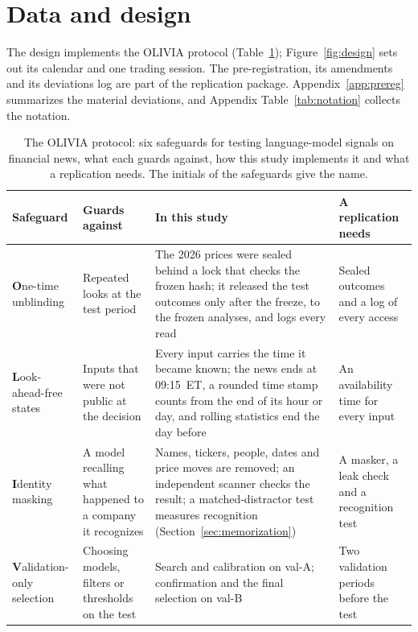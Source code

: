 \section{Data and design}\label{sec:design}

The design implements the OLIVIA protocol (Table~\ref{tab:olivia}); Figure~\ref{fig:design} sets out its calendar
and one trading session. The pre-registration, its amendments and its deviations log are part of the replication
package. Appendix~\ref{app:prereg} summarizes the material deviations, and Appendix Table~\ref{tab:notation}
collects the notation.

\begin{table}[tbp]
\centering
\footnotesize
\setlength{\tabcolsep}{4pt}
\caption{The OLIVIA protocol: six safeguards for testing language-model signals on financial news, what each
guards against, how this study implements it and what a replication needs. The initials of the safeguards give
the name.}\label{tab:olivia}
\begin{tabular}{@{}>{\raggedright\arraybackslash}p{1.0in}>{\raggedright\arraybackslash}p{1.4in}%
>{\raggedright\arraybackslash}p{2.6in}>{\raggedright\arraybackslash}p{1.1in}@{}}
\toprule
Safeguard & Guards against & In this study & A replication needs \\
\midrule
\textbf{O}ne-time unblinding & Repeated looks at the test period & The 2026 prices were sealed behind a lock that
checks the frozen hash; it released the test outcomes only after the freeze, to the frozen analyses, and logs
every read & Sealed outcomes and a log of
every access \\
\addlinespace
\textbf{L}ook-ahead-free states & Inputs that were not public at the decision & Every input carries the time it
became known; the news ends at 09:15~ET, a rounded time stamp counts from the end of its hour or day, and rolling
statistics end the day before & An availability time for every input \\
\addlinespace
\textbf{I}dentity masking & A model recalling what happened to a company it recognizes & Names, tickers, people,
dates and price moves are removed; an independent scanner checks the result; a matched-distractor test measures
recognition (Section~\ref{sec:memorization}) & A masker, a leak check and a recognition test \\
\addlinespace
\textbf{V}alidation-only selection & Choosing models, filters or thresholds on the test & Search and calibration
on val-A; confirmation and the final selection on val-B & Two validation periods before the test \\

\end{tabular}
\end{table}
